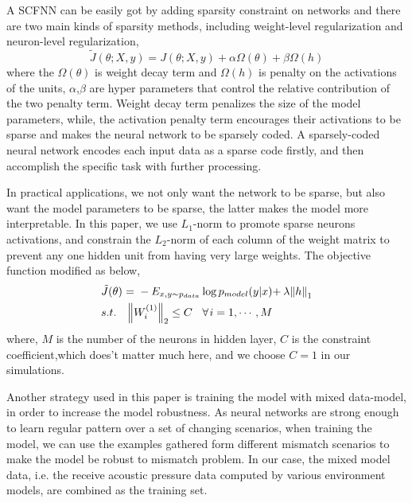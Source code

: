 A SCFNN can be easily got by adding sparsity constraint on networks and there are two main kinds of sparsity methods, including weight-level regularization and neuron-level regularization\cite{goodfellow2016deep},
\begin{equation}
\tilde J(\theta ;X,y) = J(\theta ;X,y) + \alpha \Omega (\theta )+ \beta \Omega (h)
\end{equation}
where the $\Omega (\theta )$ is weight decay term and $\Omega (h)$ is penalty on the activations of the units, $\alpha$,$\beta$ are hyper parameters that control the relative contribution of
the two penalty term. Weight decay term penalizes the size of the model parameters, while, the activation penalty term encourages their activations to be sparse and makes the neural network to be sparsely coded.
A sparsely-coded neural network encodes each input data as a sparse code firstly, and then accomplish the specific task with further processing.

In practical applications, we not only want the network to be sparse, but also want the model parameters to be sparse, the latter makes the model more interpretable. In this paper, we use $L_{1}$-norm to promote sparse neurons activations, and constrain the $L_{2}$-norm of each column of the weight matrix to prevent any one hidden unit from having very large weights. The objective function modified as below,
\begin{equation}
\begin{split}
&\tilde J(\theta ){\kern 1pt} {\kern 1pt} {\kern 1pt} {\rm{ = }}{\kern 1pt} {\kern 1pt} {\kern 1pt}  - {E_{x,y \sim {p_{data}}}}\log {p_{model}}(y|x){\rm{ + }}{\kern 1pt} {\kern 1pt} \lambda {\left\| h \right\|_1}\\
& s.t.{\kern 1pt} {\kern 1pt} {\kern 1pt} {\kern 1pt} {\kern 1pt} {\kern 1pt} {\kern 1pt} {\kern 1pt} {\kern 1pt} {\kern 1pt} {\left\| {{W^{(1)}_i}} \right\|_2} \le C{\kern 1pt} {\kern 1pt} {\kern 1pt} {\kern 1pt} {\kern 1pt} {\kern 1pt} {\kern 1pt} {\kern 1pt} {\kern 1pt} \forall {\kern 1pt} i = 1, \cdots ,M\\
\end{split}
\end{equation}
where, $M$ is the number of the neurons in hidden layer, $C$ is the constraint coefficient,which does't matter much here, and we choose $C=1$ in our simulations.


Another strategy used in this paper is training the model with mixed data-model, in order to increase the model robustness.
As neural networks are strong enough to learn regular pattern over a set of changing scenarios,
when training the model, we can use the examples gathered form different mismatch scenarios to make the model be robust to mismatch problem. In our case, the mixed model data, i.e. the receive acoustic pressure data computed by various environment models, are combined as the training set.

